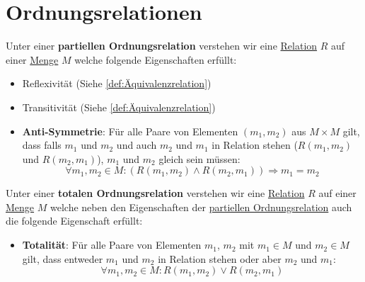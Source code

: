 \documentclass[../../main.tex]{subfiles}
\begin{document}
	\section{Ordnungsrelationen}

	\begin{definition}
		\label{def:partielleOrdnungsrelation}
		Unter einer \textbf{partiellen Ordnungsrelation} verstehen wir eine \hyperref[def:Relation]{Relation} $R$ auf einer \hyperref[def:Menge]{Menge} $M$ welche folgende Eigenschaften erfüllt:
		\begin{itemize}
			\item Reflexivität (Siehe \ref{def:Äquivalenzrelation})
			\item Transitivität (Siehe \ref{def:Äquivalenzrelation})
			\item \textbf{Anti-Symmetrie}: Für alle Paare von Elementen $(m_1, m_2)$ aus $M \times M$ gilt, dass falls $m_1$ und $m_2$ und auch $m_2$ und $m_1$ in Relation stehen ($R(m_1,m_2)$ und $R(m_2, m_1)$), $m_1$ und $m_2$ gleich sein müssen: $$\forall m_1, m_2 \in M: (R(m_1,m_2) \land R(m_2, m_1)) \Rightarrow m_1 = m_2$$
		\end{itemize}
	\end{definition}

	\begin{definition}
		Unter einer \textbf{totalen Ordnungsrelation} verstehen wir eine \hyperref[def:Relation]{Relation} $R$ auf einer \hyperref[def:Menge]{Menge} $M$ welche neben den Eigenschaften der \hyperref[def:partielleOrdnungsrelation]{partiellen Ordnungsrelation} auch die folgende Eigenschaft erfüllt:
		\begin{itemize}
			\item \textbf{Totalität}: Für alle Paare von Elementen $m_1$, $m_2$ mit $m_1 \in M$ und $m_2 \in M$ gilt, dass entweder $m_1$ und $m_2$ in Relation stehen oder aber $m_2$ und $m_1$: $$\forall m_1, m_2 \in M: R(m_1,m_2) \lor R(m_2, m_1) $$
		\end{itemize}
	\end{definition}
	
\end{document}
